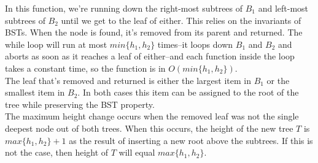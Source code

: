 \documentclass{article}
\begin{document}
\begin{enumerate}
    In this function, we're running down the right-most subtrees of $B_1$ and left-most subtrees of $B_2$ until we get to the leaf of either. This relies on the invariants of BSTs. When the node is found, it's removed from its parent and returned. The while loop will run at most $min\{h_1, h_2\}$ times--it loops down $B_1$ and $B_2$ and aborts as soon as it reaches a leaf of either--and each function inside the loop takes a constant time, so the function is in $O(min\{h_1, h_2\})$. \\

    The leaf that's removed and returned is either the largest item in $B_1$ or the smallest item in $B_2$. In both cases this item can be assigned to the root of the tree while preserving the BST property. \\

    The maximum height change occurs when the removed leaf was not the single deepest node out of both trees. When this occurs, the height of the new tree $T$ is $max\{h_1, h_2\} + 1$ as the result of inserting a new root above the subtrees. If this is not the case, then height of $T$ will equal $max\{h_1, h_2\}$.

\end{enumerate}
\end{document}
